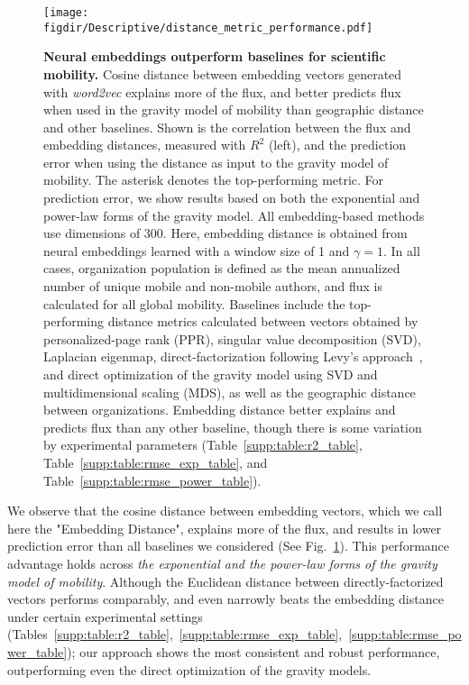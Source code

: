 \documentclass[12pt,draft,a4paper]{article}
\def\figdir{../Figs}
\newcommand{\mycaption}[2]{%
  \caption[#1]{\textbf{#1} \small#2}%
}
\begin{document}
%
%
\begin{figure}[ht!]
	\centering
	\texttt{[image: \\figdir/Descriptive/distance\_metric\_performance.pdf]}
	\mycaption
	{Neural embeddings outperform baselines for scientific mobility.}
	{
		Cosine distance between embedding vectors generated with \textit{word2vec} explains more of the flux, and better predicts flux when used in the gravity model of mobility than geographic distance and other baselines.
		Shown is the correlation between the flux and embedding distances, measured with $R^{2}$ (left), and the prediction error when using the distance as input to the gravity model of mobility.
		The asterisk denotes the top-performing metric.
		For prediction error, we show results based on both the exponential and power-law forms of the gravity model.
		All embedding-based methods use dimensions of 300.
		Here, embedding distance is obtained from neural embeddings learned with a window size of 1 and $\gamma = 1$.
		In all cases, organization population is defined as the mean annualized number of unique mobile and non-mobile authors, and flux is calculated for all global mobility.
		Baselines include the top-performing distance metrics calculated between vectors obtained by personalized-page rank (PPR), singular value decomposition (SVD), Laplacian eigenmap, direct-factorization following Levy's approach~\autocite{levy2014neural}, and direct optimization of the gravity model using SVD and multidimensional scaling (MDS), as well as the geographic distance between organizations.
		Embedding distance better explains and predicts flux than any other baseline, though there is some variation by experimental parameters (Table~\ref{supp:table:r2_table}, Table~\ref{supp:table:rmse_exp_table}, and Table~\ref{supp:table:rmse_power_table}).
	}
	\label{fig:supp:distancemetrics}
\end{figure}



We observe that the cosine distance between embedding vectors, which we call here the "Embedding Distance", explains more of the flux, and results in lower prediction error than all baselines we considered (See Fig.~\ref{fig:supp:distancemetrics}).
This performance advantage holds across \emph{the exponential and the power-law forms of the gravity model of mobility}.
Although the Euclidean distance between directly-factorized vectors performs comparably, and even narrowly beats the embedding distance under certain experimental settings (Tables~\ref{supp:table:r2_table},~\ref{supp:table:rmse_exp_table},~\ref{supp:table:rmse_power_table}); our approach shows the most consistent and robust performance, outperforming even the direct optimization of the gravity models.
\end{document}
